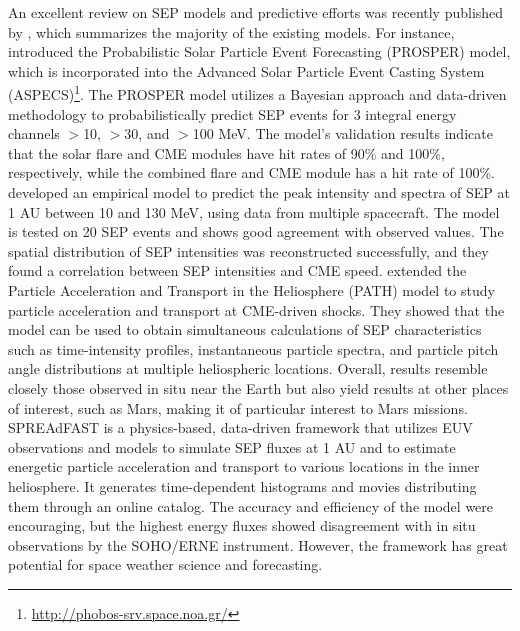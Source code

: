 An excellent review on SEP models and predictive efforts was recently published by \citet{whitman_2022}, which summarizes the majority of the existing models.
For instance, \citet{papaioannou_2022} introduced the Probabilistic Solar Particle Event Forecasting (PROSPER) model, which is incorporated into the Advanced Solar Particle Event Casting System (ASPECS)\footnote{\url{http://phobos-srv.space.noa.gr/}}. The PROSPER model utilizes a Bayesian approach and data-driven methodology to probabilistically predict SEP events for 3 integral energy channels $>$10, $>$30, and $>$100 MeV. The model's validation results indicate that the solar flare and CME modules have hit rates of 90\% and 100\%, respectively, while the combined flare and CME module has a hit rate of 100\%.
\citet{bruno_2021} developed an empirical model to predict the peak intensity and spectra of SEP at 1 AU between 10 and 130 MeV, using data from multiple spacecraft. The model is tested on 20 SEP events and shows good agreement with observed values. The spatial distribution of SEP intensities was reconstructed successfully, and they found a correlation between SEP intensities and CME speed.
\citet{hu_2017} extended the Particle Acceleration and Transport in the Heliosphere (PATH) model to study particle acceleration and transport at CME-driven shocks. They showed that the model can be used to obtain simultaneous calculations of SEP characteristics such as time-intensity profiles, instantaneous particle spectra, and particle pitch angle distributions at multiple heliospheric locations. Overall, results resemble closely those observed in situ near the Earth but also yield results at other places of interest, such as Mars, making it of particular interest to Mars missions.
SPREAdFAST \citep{kozarev_2017, kozarev_2022} is a physics-based, data-driven framework that utilizes EUV observations and models to simulate SEP fluxes at 1 AU and to estimate energetic particle acceleration and transport to various locations in the inner heliosphere. It generates time-dependent histograms and movies distributing them through an online catalog. The accuracy and efficiency of the model were encouraging, but the highest energy fluxes showed disagreement with in situ observations by the SOHO/ERNE instrument. However, the framework has great potential for space weather science and forecasting.

